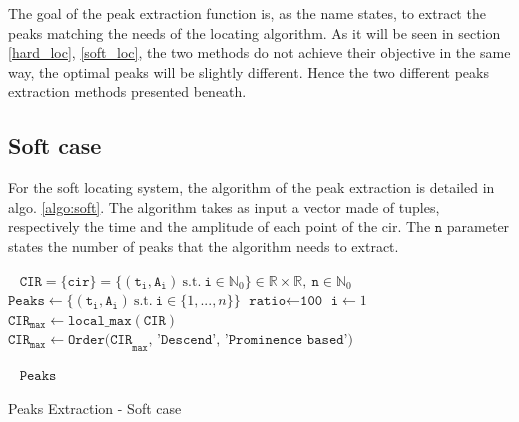 The goal of the peak extraction function is, as the name states, to extract the peaks matching the needs of the locating algorithm. As it will be seen in section \ref{hard_loc}, \ref{soft_loc}, the two methods do not achieve their objective in the same way, the optimal peaks will be slightly different. Hence the two different peaks extraction methods presented beneath.

\subsection{Soft case}

For the soft locating system, the algorithm of the peak extraction is detailed in algo. \ref{algo:soft}. The algorithm takes as input a vector made of tuples, respectively the time and the amplitude of each point of the \gls{cir}. The $\texttt{n}$ parameter states the number of peaks that the algorithm needs to extract.
\vspace{2mm}


\begin{algorithm}[H]
 \KwInput{}\
 \hspace*{\algorithmicindent} $\mathtt{CIR} = \{\mathtt{cir}\} = \{ (\mathtt{t_i}, \mathtt{A_i}) ~\text{s.t.} ~\mathtt{i} \in \mathbb{N}_0\} \in \mathbb{R} \times \mathbb{R}, ~\mathtt{n} \in \mathbb{N}_0$ \;
\KwInit{}
\hspace*{\algorithmicindent} $\texttt{Peaks} \longleftarrow \{ (\mathtt{t_i}, \mathtt{A_i}) ~\text{s.t.} ~\mathtt{i} \in \{ 1, ..., n \} \}$\;
\hspace*{\algorithmicindent} $\texttt{ratio} \longleftarrow \texttt{100}$\;
\hspace*{\algorithmicindent} $\texttt{i} \longleftarrow 1$\;
\hspace*{\algorithmicindent} $\texttt{CIR}_\texttt{max} \longleftarrow \texttt{local\_max}(\texttt{CIR})$\;
\hspace*{\algorithmicindent} $\texttt{CIR}_\texttt{max} \longleftarrow \texttt{Order(CIR}_\texttt{max}\texttt{, 'Descend', 'Prominence based')}$\;


 \KwOutput{}\
 \hspace*{\algorithmicindent} $\texttt{Peaks}$\;
 \caption{Peaks Extraction - Soft case \label{algo:soft}}
\end{algorithm}
\vspace{2mm}

